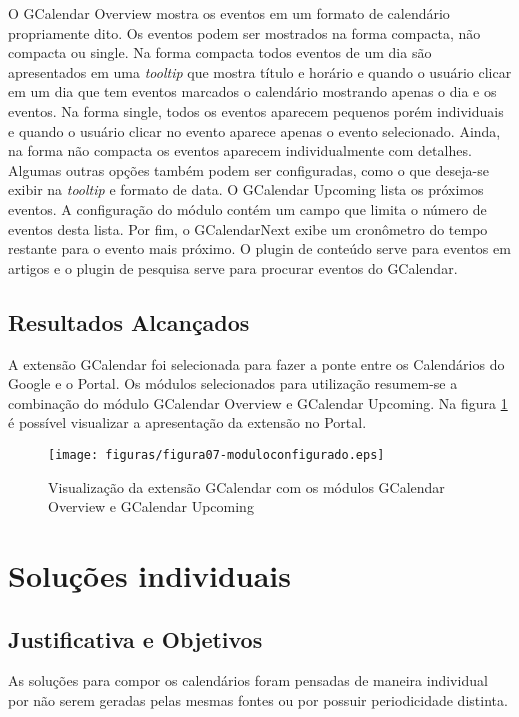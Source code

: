 O GCalendar Overview mostra os eventos em um formato de calendário propriamente dito. Os eventos podem ser mostrados na forma compacta, não compacta ou single. Na forma compacta todos eventos de um dia são apresentados em uma \emph{tooltip} que mostra título e horário e quando o usuário clicar em um dia que tem eventos marcados o calendário mostrando apenas o dia e os eventos. Na forma single, todos os eventos aparecem pequenos porém individuais e quando o usuário clicar no evento aparece apenas o evento selecionado. Ainda, na forma não compacta os eventos aparecem individualmente com detalhes. Algumas outras opções também podem ser configuradas, como o que deseja-se exibir na \emph{tooltip} e formato de data.
O GCalendar Upcoming lista os próximos eventos. A configuração do módulo contém um campo que limita o número de eventos desta lista.
Por fim, o GCalendarNext exibe um cronômetro do tempo restante para o evento mais próximo.
O plugin de conteúdo serve para eventos em artigos e o plugin de pesquisa serve para procurar eventos do GCalendar.

\subsection{Resultados Alcançados}
A extensão GCalendar foi selecionada para fazer a ponte entre os Calendários do Google e o Portal. Os módulos selecionados para utilização resumem-se a combinação do módulo GCalendar Overview e GCalendar Upcoming. Na figura \ref{fig:GCalendar apresentacao} é possível visualizar a apresentação da extensão no Portal.

\begin{figure}[hbtn]
   \centering
   \texttt{[image: figuras/figura07-moduloconfigurado.eps]}
   \caption{Visualização da extensão GCalendar com os módulos GCalendar Overview e GCalendar Upcoming}
   \label{fig:GCalendar apresentacao}
\end{figure}

\section{Soluções individuais}
\subsection{Justificativa e Objetivos}
As soluções para compor os calendários foram pensadas de maneira individual por não serem geradas pelas mesmas fontes ou por possuir periodicidade distinta. 

